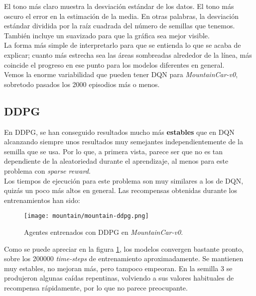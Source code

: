 \documentclass[11pt,fleqn]{book} %
\begin{document}
El tono más claro muestra la desviación estándar de los datos. El tono más oscuro el error en la estimación de la media. En otras palabras, la desviación estándar dividida por la raíz cuadrada del número de semillas que tenemos. También incluye un suavizado para que la gráfica sea mejor visible. \\

La forma más simple de interpretarlo para que se entienda lo que se acaba de explicar; cuanto más estrecha sea las áreas sombreadas alrededor de la línea, más coincide el progreso en ese punto para los modelos diferentes en general. \\

Vemos la enorme variabilidad que pueden tener DQN para \textit{MountainCar-v0}, sobretodo pasados los 2000 episodios más o menos.

\subsection{DDPG}

En DDPG, se han conseguido resultados mucho más \textbf{estables} que en DQN alcanzando siempre unos resultados muy semejantes independientemente de la semilla que se usa. Por lo que, a primera vista, parece ser que no es tan dependiente de la aleatoriedad durante el aprendizaje, al menos para este problema con \textit{sparse reward}. \\

Los tiempos de ejecución para este problema son muy similares a los de DQN, quizás un poco más altos en general. Las recompensas obtenidas durante los entrenamientos han sido:

\begin{figure}[H]
	\centering\texttt{[image: mountain/mountain-ddpg.png]}
	\caption{Agentes entrenados con DDPG en \textit{MountainCar-v0}.}
	\label{fig:mountainDDPG} %
\end{figure} 

Como se puede apreciar en la figura \ref{fig:mountainDDPG}, los modelos convergen bastante pronto, sobre los 200000 \textit{time-steps} de entrenamiento aproximadamente. Se mantienen muy estables, no mejoran más, pero tampoco empeoran. En la semilla 3 se produjeron algunas caídas repentinas, volviendo a sus valores habituales de recompensa rápidamente, por lo que no parece preocupante.
\end{document}
